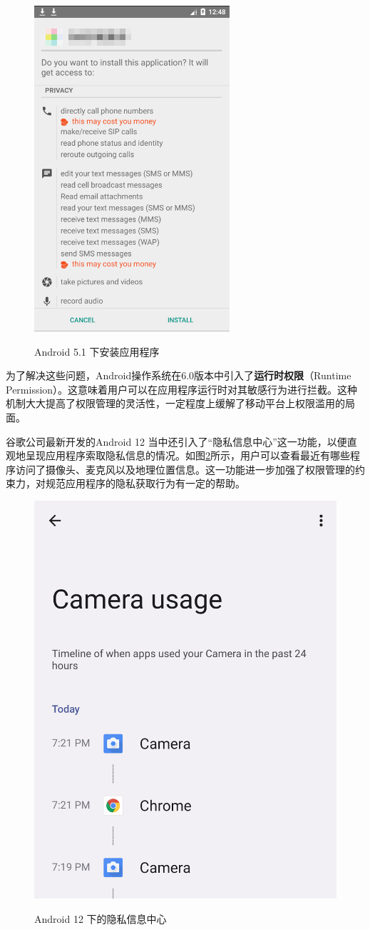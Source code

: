 \begin{figure}[H]
	\begin{center}
		\includegraphics[width=0.3\columnwidth]{Chapter14/graph/android5.png} \\
	\end{center}
	\vspace{-10pt}
	\caption{Android 5.1 下安装应用程序} \label{fig:android5}
	\vspace{-10pt}
\end{figure}

为了解决这些问题，Android操作系统在6.0版本中引入了\textcolor{myblue}{\textbf{运行时权限}}（Runtime Permission）。这意味着用户可以在应用程序运行时对其敏感行为进行拦截。这种机制大大提高了权限管理的灵活性，一定程度上缓解了移动平台上权限滥用的局面。

谷歌公司最新开发的Android 12 当中还引入了``隐私信息中心''这一功能，以便直观地呈现应用程序索取隐私信息的情况。如图\ref{fig:android12}所示，用户可以查看最近有哪些程序访问了摄像头、麦克风以及地理位置信息。这一功能进一步加强了权限管理的约束力，对规范应用程序的隐私获取行为有一定的帮助。

\begin{figure}[H]
	\begin{center}
		\includegraphics[width=0.3\columnwidth]{Chapter14/graph/android12.png} \\
	\end{center}
	\vspace{-10pt}
	\caption{Android 12 下的隐私信息中心} \label{fig:android12}
	\vspace{-10pt}
\end{figure}


